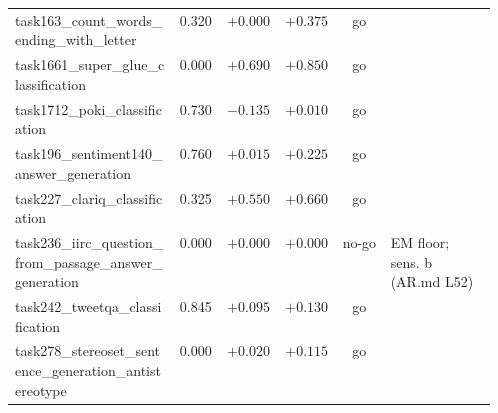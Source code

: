 \begin{longtable}{@{}p{0.34\linewidth}rrrcp{0.22\linewidth}@{}}
\scriptsize task163\_\hspace{0pt}count\_\hspace{0pt}words\_\hspace{0pt}ending\_\hspace{0pt}with\_\hspace{0pt}letter & \scriptsize 0.320 & \scriptsize $+0.000$ & \scriptsize $+0.375$ & \scriptsize go & \scriptsize  \\
\scriptsize task1661\_\hspace{0pt}super\_\hspace{0pt}glue\_\hspace{0pt}classification & \scriptsize 0.000 & \scriptsize $+0.690$ & \scriptsize $+0.850$ & \scriptsize go & \scriptsize  \\
\scriptsize task1712\_\hspace{0pt}poki\_\hspace{0pt}classification & \scriptsize 0.730 & \scriptsize $-0.135$ & \scriptsize $+0.010$ & \scriptsize go & \scriptsize  \\
\scriptsize task196\_\hspace{0pt}sentiment140\_\hspace{0pt}answer\_\hspace{0pt}generation & \scriptsize 0.760 & \scriptsize $+0.015$ & \scriptsize $+0.225$ & \scriptsize go & \scriptsize  \\
\scriptsize task227\_\hspace{0pt}clariq\_\hspace{0pt}classification & \scriptsize 0.325 & \scriptsize $+0.550$ & \scriptsize $+0.660$ & \scriptsize go & \scriptsize  \\
\scriptsize task236\_\hspace{0pt}iirc\_\hspace{0pt}question\_\hspace{0pt}from\_\hspace{0pt}passage\_\hspace{0pt}answer\_\hspace{0pt}generation & \scriptsize 0.000 & \scriptsize $+0.000$ & \scriptsize $+0.000$ & \scriptsize no-go & \scriptsize EM floor; sens. b (AR.md L52) \\
\scriptsize task242\_\hspace{0pt}tweetqa\_\hspace{0pt}classification & \scriptsize 0.845 & \scriptsize $+0.095$ & \scriptsize $+0.130$ & \scriptsize go & \scriptsize  \\
\scriptsize task278\_\hspace{0pt}stereoset\_\hspace{0pt}sentence\_\hspace{0pt}generation\_\hspace{0pt}antistereotype & \scriptsize 0.000 & \scriptsize $+0.020$ & \scriptsize $+0.115$ & \scriptsize go & \scriptsize  \\

\end{longtable}
